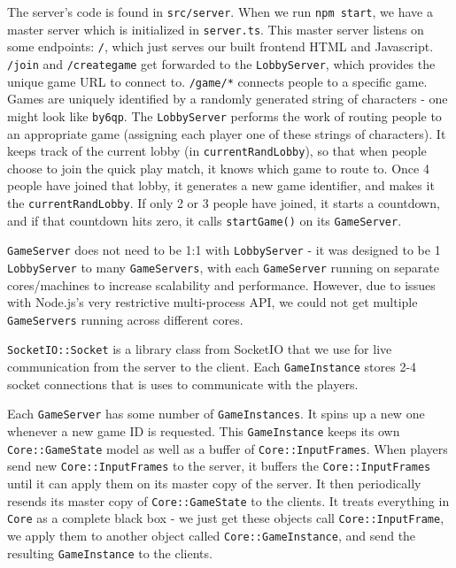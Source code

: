 \documentclass[12pt]{report}
\begin{document}
The server's code is found in \texttt{src/server}. When we run \texttt{npm start}, we have a master server which is initialized in \texttt{server.ts}. This master server listens on some endpoints: \texttt{/}, which just serves our built frontend HTML and Javascript. \texttt{/join} and \texttt{/creategame} get forwarded to the \texttt{LobbyServer}, which provides the unique game URL to connect to. \texttt{/game/*} connects people to a specific game.
Games are uniquely identified by a randomly generated string of characters - one might look like \texttt{by6qp}. The \texttt{LobbyServer} performs the work of routing people to an appropriate game (assigning each player one of these strings of characters). It keeps track of the current lobby (in \texttt{currentRandLobby}), so that when people choose to join the quick play match, it knows which game to route to. Once 4 people have joined that lobby, it generates a new game identifier, and makes it the \texttt{currentRandLobby}. If only 2 or 3 people have joined, it starts a countdown, and if that countdown hits zero, it calls \texttt{startGame()} on its \texttt{GameServer}.


\texttt{GameServer} does not need to be 1:1 with \texttt{LobbyServer} - it was designed to be 1 \texttt{LobbyServer} to many \texttt{GameServers}, with each \texttt{GameServer} running on separate cores/machines to increase scalability and performance. However, due to issues with Node.js's very restrictive multi-process API, we could not get multiple \texttt{GameServers} running across different cores.


\texttt{SocketIO::Socket} is a library class from SocketIO that we use for live communication from the server to the client. Each \texttt{GameInstance} stores 2-4 socket connections that is uses to communicate with the players.


Each \texttt{GameServer} has some number of \texttt{GameInstances}. It spins up a new one whenever a new game ID is requested. This \texttt{GameInstance} keeps its own  \texttt{Core::GameState} model as well as a buffer of \texttt{Core::InputFrames}. When players send new \texttt{Core::InputFrames} to the server, it buffers the \texttt{Core::InputFrames} until it can apply them on its master copy of the server. It then periodically resends its master copy of \texttt{Core::GameState} to the clients. It treats everything in \texttt{Core} as a complete black box - we just get these objects call \texttt{Core::InputFrame}, we apply them to another object called \texttt{Core::GameInstance}, and send the resulting \texttt{GameInstance} to the clients.
\end{document}
